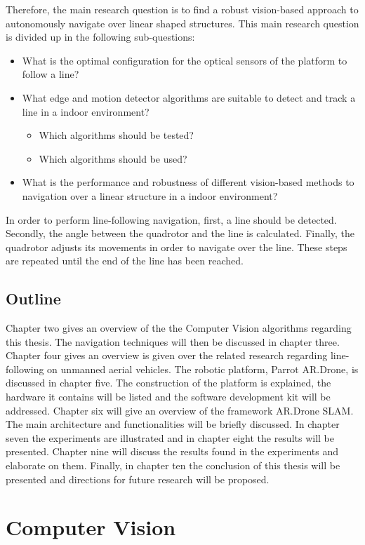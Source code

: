 \documentclass[a4paper]{article}
\begin{document}
Therefore, the main research question is to find a robust vision-based approach to autonomously navigate over linear shaped structures. This main research question is divided up in the following sub-questions:
\begin{itemize}
\item What is the optimal configuration for the optical sensors of the platform to follow a line?
\item What edge and motion detector algorithms are suitable to detect and track a line in a indoor environment?
	\begin{itemize}
	\item Which algorithms should be tested?
	\item Which algorithms should be used?
	\end{itemize}
\item What is the performance and robustness of different vision-based methods to navigation over a linear structure in a indoor environment?
\end{itemize}
In order to perform line-following navigation, first, a line should be detected. Secondly, the angle between the quadrotor and the line is calculated. Finally, the quadrotor adjusts its movements in order to navigate over the line. These steps are repeated until the end of the line has been reached.

\subsection{Outline}
Chapter two gives an overview of the the Computer Vision algorithms regarding this thesis. The navigation techniques will then be discussed in chapter three.
Chapter four gives an overview is given over the related research regarding line-following on unmanned aerial vehicles. The robotic platform, Parrot AR.Drone, is discussed in chapter five. The construction of the platform is explained, the hardware it contains will be listed and the software development kit will be addressed. Chapter six will give an overview of the framework AR.Drone SLAM. The main architecture and functionalities will be briefly discussed. In chapter seven the experiments are illustrated and in chapter eight the results will be presented. Chapter nine will discuss the results found in the experiments and elaborate on them. Finally, in chapter ten the conclusion of this thesis will be presented and directions for future research will be proposed.

\newpage
\section{Computer Vision}
\end{document}
